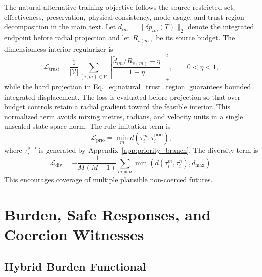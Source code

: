 \documentclass[10pt]{article}
\begin{document}
The natural alternative training objective follows the source-restricted set, effectiveness, preservation, physical-consistency, mode-usage, and trust-region decomposition in the main text. Let $\widetilde{d}_{im}=\|\widetilde{\delta p}_{im}(T)\|_2$ denote the integrated endpoint before radial projection and let $R_{s(m)}$ be its source budget. The dimensionless interior regularizer is
\begin{equation}
    \mathcal{L}_{\mathrm{trust}}
    =
    \frac{1}{|\mathcal{V}|}
    \sum_{(i,m)\in\mathcal{V}}
    \left[
      \frac{\widetilde{d}_{im}/R_{s(m)}-\eta}{1-\eta}
    \right]_+^2,
    \qquad 0<\eta<1,
\end{equation}
while the hard projection in Eq.~\eqref{eq:natural_trust_region} guarantees bounded integrated displacement. The loss is evaluated before projection so that over-budget controls retain a radial gradient toward the feasible interior. This normalized term avoids mixing metres, radians, and velocity units in a single unscaled state-space norm.
The rule imitation term is
\begin{equation}
    \mathcal{L}_{\mathrm{prio}}
    =
    \min_m
    d(\tau_i^m,\tau_i^{\mathrm{prio}}),
\end{equation}
where $\tau_i^{\mathrm{prio}}$ is generated by Appendix~\ref{app:priority_branch}. The diversity term is
\begin{equation}
    \mathcal{L}_{\mathrm{div}}
    =
    -
    \frac{1}{M(M-1)}
    \sum_{m\neq n}
    \min
    \left(
    d(\tau_i^m,\tau_i^n),
    d_{\max}
    \right).
\end{equation}
This encourages coverage of multiple plausible non-coerced futures.

\section{Burden, Safe Responses, and Coercion Witnesses}
\label{app:burden_witness}

\subsection{Hybrid Burden Functional}
\label{app:burden}
\end{document}
